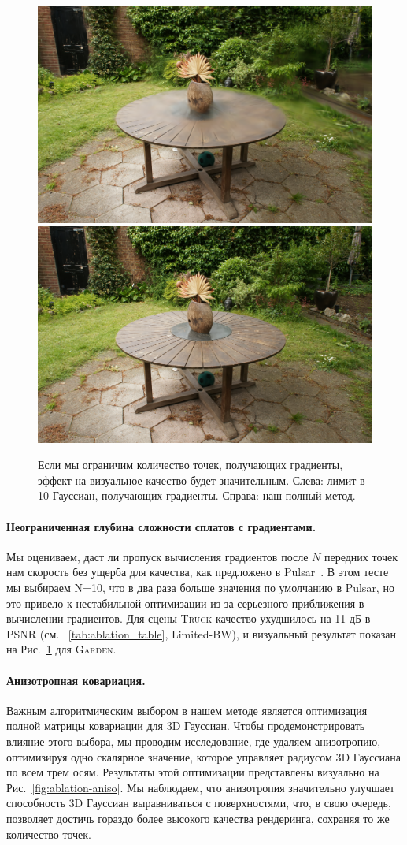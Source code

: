 \begin{figure}[!h]
    \includegraphics[width=.49\linewidth]{figures/ablations/images/30k/garden/limitedBW.png}
    \includegraphics[width=.49\linewidth]{figures/ablations/images/30k/garden/full.png}
    \caption{
        Если мы ограничим количество точек, получающих градиенты, эффект на визуальное качество будет значительным.
        Слева: лимит в 10 Гауссиан, получающих градиенты. Справа: наш полный метод.
        \label{fig:gradients}
    }
\end{figure}

\paragraph{Неограниченная глубина сложности сплатов с градиентами.}
Мы оцениваем, даст ли пропуск вычисления градиентов после $N$ передних точек нам скорость без ущерба для качества, как предложено в Pulsar~\cite{Lassner_2021_CVPR}. В этом тесте мы выбираем N=10, что в два раза больше значения по умолчанию в Pulsar, но это привело к нестабильной оптимизации из-за серьезного приближения в вычислении градиентов. Для сцены \textsc{Truck} качество ухудшилось на 11 дБ в PSNR (см. ~\ref{tab:ablation_table}, Limited-BW), и визуальный результат показан на Рис.~\ref{fig:gradients} для \textsc{Garden}.

\paragraph{Анизотропная ковариация.}
Важным алгоритмическим выбором в нашем методе является оптимизация полной матрицы ковариации для 3D Гауссиан. Чтобы продемонстрировать влияние этого выбора, мы проводим исследование, где удаляем анизотропию, оптимизируя одно скалярное значение, которое управляет радиусом 3D Гауссиана по всем трем осям. Результаты этой оптимизации представлены визуально на Рис.~\ref{fig:ablation-aniso}. Мы наблюдаем, что анизотропия значительно улучшает способность 3D Гауссиан выравниваться с поверхностями, что, в свою очередь, позволяет достичь гораздо более высокого качества рендеринга, сохраняя то же количество точек.

